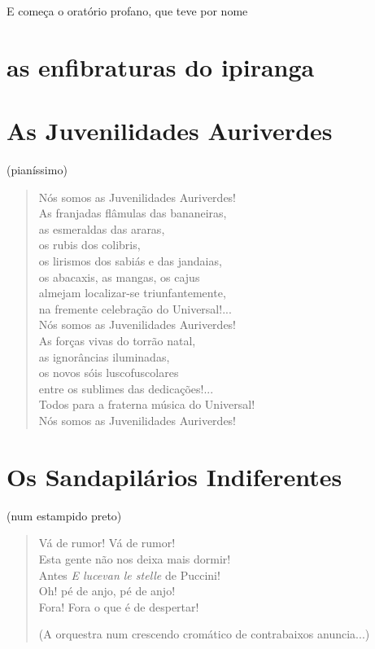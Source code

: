 E começa o oratório profano, que teve por nome

\section*{as enfibraturas do ipiranga}

\section*{As Juvenilidades Auriverdes}

\hfill{}(pianíssimo)

\begin{verse}
Nós somos as Juvenilidades Auriverdes!\\
As franjadas flâmulas das bananeiras,\\
as esmeraldas das araras,\\
os rubis dos colibris,\\
os lirismos dos sabiás e das jandaias,\\
os abacaxis, as mangas, os cajus\\
almejam localizar-se triunfantemente,\\
na fremente celebração do Universal!...\\
Nós somos as Juvenilidades Auriverdes!\\
As forças vivas do torrão natal,\\
as ignorâncias iluminadas,\\
os novos sóis luscofuscolares\\
entre os sublimes das dedicações!...\\
Todos para a fraterna música do Universal!\\
Nós somos as Juvenilidades Auriverdes!
\end{verse}

\section*{Os Sandapilários Indiferentes}

\hfill{}(num estampido preto)

\begin{verse}
Vá de rumor! Vá de rumor!\\
Esta gente não nos deixa mais dormir!\\
Antes \emph{E lucevan le stelle} de Puccini!\\
Oh! pé de anjo, pé de anjo!\\
Fora! Fora o que é de despertar!

\hfill{}(A orquestra num crescendo cromático de contrabaixos anuncia...)
\end{verse}


